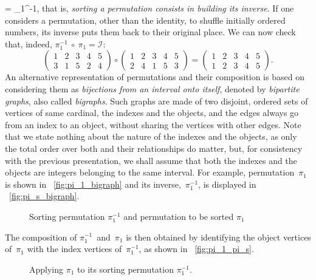 = \pi_1^{-1}, \) that is, \emph{sorting a permutation consists in
  building its inverse}. If one considers a permutation, other than
the identity, to shuffle initially ordered numbers, its inverse puts
them back to their original place. We can now check that, indeed,
\(\pi_1^{-1}~\circ~\pi_1 = \mathcal{I}\):
\[
\begin{pmatrix}
1 & 2 & 3 & 4 & 5\\
3 & 1 & 5 & 2 & 4
\end{pmatrix}
\circ
\begin{pmatrix}
1 & 2 & 3 & 4 & 5\\
2 & 4 & 1 & 5 & 3
\end{pmatrix}
=
\begin{pmatrix}
1 & 2 & 3 & 4 & 5\\
1 & 2 & 3 & 4 & 5
\end{pmatrix}.
\]
An alternative representation of permutations and their composition is
based on considering them as \emph{bijections from an interval onto
  itself}, denoted by \emph{bipartite graphs}, also called
\emph{bigraphs}. Such graphs are made of two disjoint, ordered sets of
vertices of same cardinal, the indexes and the objects, and the edges
always go from an index to an object, without sharing the vertices
with other edges. Note that we state nothing about the nature of the
indexes and the objects, as only the total order over both and their
relationships do matter, but, for consistency with the previous
presentation, we shall assume that both the indexes and the objects
are integers belonging to the same interval. For example,
permutation~\(\pi_1\) is shown in \fig~\vref{fig:pi_1_bigraph} and its
inverse,~\(\pi_1^{-1}\), is displayed in \fig~\vref{fig:pi_s_bigraph}.
\begin{figure}[t]
\centering
{}
\qquad\qquad
{}
\caption{Sorting permutation \(\pi_{1}^{-1}\) and permutation to be
  sorted \(\pi_1\)\label{fig:pi_1}}
\end{figure}
The composition of \(\pi_1^{-1}\)~and~\(\pi_1\) is then obtained by
identifying the object vertices of~\(\pi_1\) with the index vertices
of~\(\pi_1^{-1}\), as shown in \fig~\vref{fig:pi_1_pi_s}.
\begin{figure}[b]
\centering
{}%
\qquad\qquad
\subfloat[\(\mathcal{I} = \pi_1^{-1} \circ \pi_1\)\label{fig:pi_2}]{%
\texttt{[image: pi\_2]}
}
\caption{Applying \(\pi_1\) to its sorting permutation
  \(\pi_1^{-1}\).}
\end{figure}
